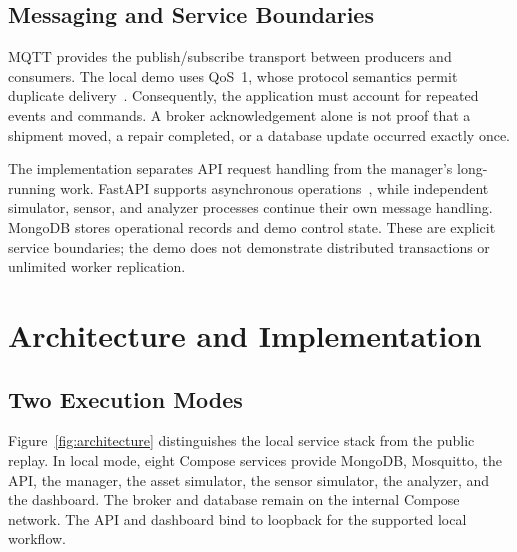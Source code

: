 \documentclass[journal]{IEEEtran}
\begin{document}
\subsection{Messaging and Service Boundaries}
MQTT provides the publish/subscribe transport between producers and consumers. The local demo uses QoS~1, whose protocol semantics permit duplicate delivery~\citep{mqtt}. Consequently, the application must account for repeated events and commands. A broker acknowledgement alone is not proof that a shipment moved, a repair completed, or a database update occurred exactly once.

The implementation separates API request handling from the manager's long-running work. FastAPI supports asynchronous operations~\citep{fastapi}, while independent simulator, sensor, and analyzer processes continue their own message handling. MongoDB stores operational records and demo control state. These are explicit service boundaries; the demo does not demonstrate distributed transactions or unlimited worker replication.

\section{Architecture and Implementation}
\subsection{Two Execution Modes}
Figure~\ref{fig:architecture} distinguishes the local service stack from the public replay. In local mode, eight Compose services provide MongoDB, Mosquitto, the API, the manager, the asset simulator, the sensor simulator, the analyzer, and the dashboard. The broker and database remain on the internal Compose network. The API and dashboard bind to loopback for the supported local workflow.
\end{document}
